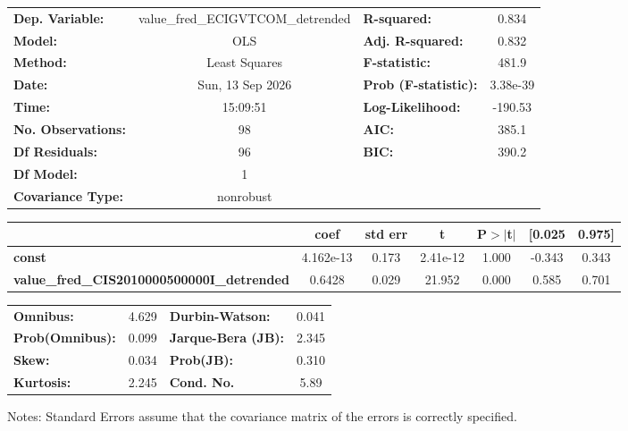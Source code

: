 \begin{center}
\begin{tabular}{lclc}
\toprule
\textbf{Dep. Variable:}                            & value\_fred\_ECIGVTCOM\_detrended & \textbf{  R-squared:         } &     0.834   \\
\textbf{Model:}                                    &                OLS                & \textbf{  Adj. R-squared:    } &     0.832   \\
\textbf{Method:}                                   &           Least Squares           & \textbf{  F-statistic:       } &     481.9   \\
\textbf{Date:}                                     &          Sun, 13 Sep 2026         & \textbf{  Prob (F-statistic):} &  3.38e-39   \\
\textbf{Time:}                                     &              15:09:51             & \textbf{  Log-Likelihood:    } &   -190.53   \\
\textbf{No. Observations:}                         &                   98              & \textbf{  AIC:               } &     385.1   \\
\textbf{Df Residuals:}                             &                   96              & \textbf{  BIC:               } &     390.2   \\
\textbf{Df Model:}                                 &                    1              & \textbf{                     } &             \\
\textbf{Covariance Type:}                          &             nonrobust             & \textbf{                     } &             \\
\bottomrule
\end{tabular}
\begin{tabular}{lcccccc}
                                                   & \textbf{coef} & \textbf{std err} & \textbf{t} & \textbf{P$> |$t$|$} & \textbf{[0.025} & \textbf{0.975]}  \\
\midrule
\textbf{const}                                     &    4.162e-13  &        0.173     &  2.41e-12  &         1.000        &       -0.343    &        0.343     \\
\textbf{value\_fred\_CIS2010000500000I\_detrended} &       0.6428  &        0.029     &    21.952  &         0.000        &        0.585    &        0.701     \\
\bottomrule
\end{tabular}
\begin{tabular}{lclc}
\textbf{Omnibus:}       &  4.629 & \textbf{  Durbin-Watson:     } &    0.041  \\
\textbf{Prob(Omnibus):} &  0.099 & \textbf{  Jarque-Bera (JB):  } &    2.345  \\
\textbf{Skew:}          &  0.034 & \textbf{  Prob(JB):          } &    0.310  \\
\textbf{Kurtosis:}      &  2.245 & \textbf{  Cond. No.          } &     5.89  \\
\bottomrule
\end{tabular}
\end{center}

Notes: \newline
 [1] Standard Errors assume that the covariance matrix of the errors is correctly specified.